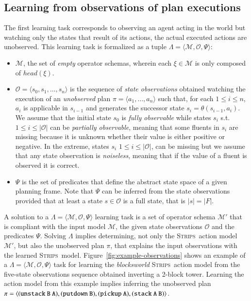 \documentclass[3p,times]{elsarticle}
\newcommand{\strips}{\textsc{Strips}}     %
\newcommand{\tup}[1]{{\langle #1 \rangle}}
\begin{document}
\subsection{Learning from observations of plan executions}
The first learning task corresponds to observing an agent acting in the world but watching only the states that result of its actions, the actual executed actions are unobserved. This learning task is formalized as a tuple $\Lambda=\tup{\mathcal{M},\mathcal{O},\Psi}$:
\begin{itemize}
\item $\mathcal{M}$, the set of {\em empty} operator schemas, wherein each $\xi\in\mathcal{M}$ is only composed of $head(\xi)$. 
\item $\mathcal{O}=\tup{s_0,s_1,\ldots,s_{n}}$ is the sequence of {\em state observations} obtained watching the execution of an {\em unobserved} plan $\pi=\tup{a_1, \ldots, a_n}$ such that, for each {\small $1\leq i\leq n$}, $a_i$ is applicable in $s_{i-1}$ and generates the successor state $s_i=\theta(s_{i-1},a_i)$. We assume that the initial state $s_0$ is {\em fully observable} while states $s_i$ s.t. {\small $1\leq i\leq |\mathcal{O}|$} can be {\em partially observable}, meaning that some fluents in $s_i$ are missing because it is unknown whether their value is either positive or negative. In the extreme, states $s_i$ {\small $1\leq i\leq |\mathcal{O}|$}, can be missing but we assume that any state observation is {\em noiseless}, meaning that if the value of a fluent is observed it is correct. 
\item $\Psi$ is the set of predicates that define the abstract state space of a given planning frame. Note that $\Psi$ can be inferred from the state observations provided that at least a state $s\in \mathcal{O}$ is a full state, that is $|s|=|F|$.
\end{itemize}

A solution to a $\Lambda=\tup{\mathcal{M},\mathcal{O},\Psi}$ learning task is a set of operator schema $\mathcal{M}'$ that is compliant with the input model $\mathcal{M}$, the given state observations $\mathcal{O}$ and the predicates $\Psi$. Solving $\Lambda$ implies determining, not only the \strips\ action model $\mathcal{M}'$, but also the unobserved plan $\pi$, that explains the input observations with the learned \strips\ model. Figure~\ref{fig:example-observations} shows an example of a $\Lambda=\tup{\mathcal{M},\mathcal{O},\Psi}$ task for learning the {\em blocksworld} \strips\ action model from the five-state observations sequence obtained inverting a 2-block tower. Learning the action model from this example implies inferring the unobserved plan $\pi=\tup{\small\tt (unstack\ B\ A), (putdown\ B), (pickup\ A), (stack\ A\ B)}$.
\end{document}
